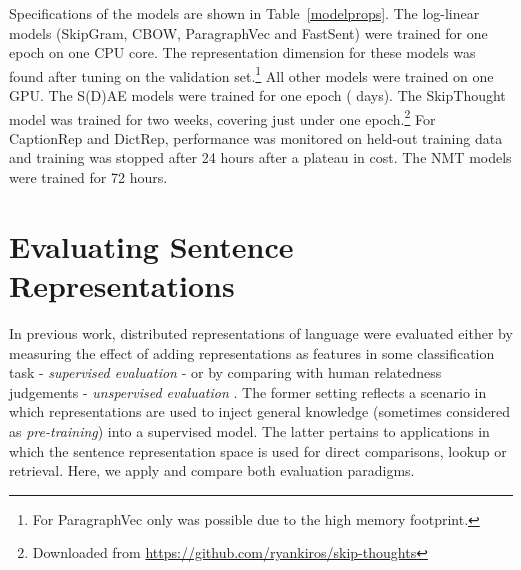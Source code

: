 \documentclass[11pt,letterpaper]{article}
\begin{document}
Specifications of the models are shown in Table~\ref{modelprops}. The log-linear models (SkipGram, CBOW, ParagraphVec and FastSent) were trained for one epoch on one CPU core. The representation dimension  for these models was found after tuning  on the validation set.\footnote{For ParagraphVec only  was possible due to the high memory footprint.} All other models were trained on one GPU. The S(D)AE models were trained for one epoch ( days). The SkipThought model was trained for two weeks, covering just under one epoch.\footnote{Downloaded from {\scriptsize \url{https://github.com/ryankiros/skip-thoughts}}} For CaptionRep and DictRep, performance was monitored on held-out training data and training was stopped after 24 hours after a plateau in cost. The NMT models were trained for 72 hours. 

\section{Evaluating Sentence Representations}

In previous work, distributed representations of language were evaluated either by measuring the effect of adding representations as features in some classification task - \emph{supervised evaluation} \cite{collobert2011natural,mikolov2013efficient,kiros2015skip} - or by comparing with human relatedness judgements - \emph{unspervised evaluation} \cite{hill2015learning,baroni2014don,levy2015improving}. The former setting reflects a scenario in which representations are used to inject general knowledge (sometimes considered as \emph{pre-training}) into a supervised model. The latter pertains to applications in which the sentence representation space is used for direct comparisons, lookup or retrieval. Here, we apply and compare both evaluation paradigms.  
\end{document}
